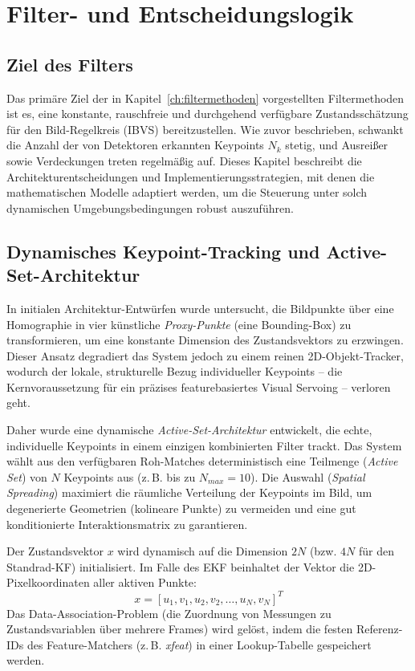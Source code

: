 \chapter{Filter- und Entscheidungslogik}
\label{ch:FilterundEntscheidungslogik}

\section{Ziel des Filters}
\label{sec:ZieldesFilters}
Das primäre Ziel der in Kapitel~\ref{ch:filtermethoden} vorgestellten Filtermethoden ist es, eine konstante, rauschfreie und durchgehend verfügbare Zustandsschätzung für den Bild-Regelkreis (\ac{IBVS}) bereitzustellen. Wie zuvor beschrieben, schwankt die Anzahl der von Detektoren erkannten Keypoints $N_k$ stetig, und Ausreißer sowie Verdeckungen treten regelmäßig auf. Dieses Kapitel beschreibt die Architekturentscheidungen und Implementierungsstrategien, mit denen die mathematischen Modelle adaptiert werden, um die Steuerung unter solch dynamischen Umgebungsbedingungen robust auszuführen.

\section{Dynamisches Keypoint-Tracking und Active-Set-Architektur}
\label{sec:ActiveSet}
In initialen Architektur-Entwürfen wurde untersucht, die Bildpunkte über eine Homographie in vier künstliche \textit{Proxy-Punkte} (eine Bounding-Box) zu transformieren, um eine konstante Dimension des Zustandsvektors zu erzwingen. Dieser Ansatz degradiert das System jedoch zu einem reinen 2D-Objekt-Tracker, wodurch der lokale, strukturelle Bezug individueller Keypoints -- die Kernvoraussetzung für ein präzises featurebasiertes Visual Servoing -- verloren geht.

Daher wurde eine dynamische \textit{Active-Set-Architektur} entwickelt, die echte, individuelle Keypoints in einem einzigen kombinierten Filter trackt. Das System wählt aus den verfügbaren Roh-Matches deterministisch eine Teilmenge (\textit{Active Set}) von $N$ Keypoints aus (z.\,B. bis zu $N_{max} = 10$). Die Auswahl (\textit{Spatial Spreading}) maximiert die räumliche Verteilung der Keypoints im Bild, um degenerierte Geometrien (kolineare Punkte) zu vermeiden und eine gut konditionierte Interaktionsmatrix zu garantieren.

Der Zustandsvektor $x$ wird dynamisch auf die Dimension $2N$ (bzw. $4N$ für den Standrad-\ac{KF}) initialisiert. Im Falle des \ac{EKF} beinhaltet der Vektor die 2D-Pixelkoordinaten aller aktiven Punkte:
\begin{equation}
    x = [u_1, v_1, u_2, v_2, \dots, u_N, v_N]^T
\end{equation}
Das Data-Association-Problem (die Zuordnung von Messungen zu Zustandsvariablen über mehrere Frames) wird gelöst, indem die festen Referenz-IDs des Feature-Matchers (z.\,B. \textit{xfeat}) in einer Lookup-Tabelle gespeichert werden. 

